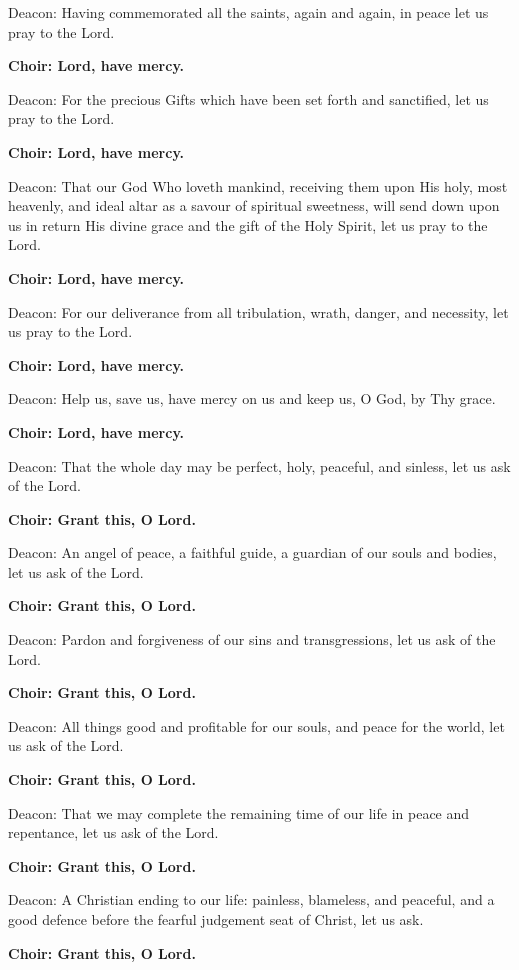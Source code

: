 \documentclass[12pt,a4paper,titlepage]{report}
\begin{document}
\begin{paracol}[1]{2}
  Deacon: Having commemorated all the saints, again and again, in peace let us pray to the Lord.

  \textbf{Choir: Lord, have mercy.}

  Deacon: For the precious Gifts which have been set forth and sanctified, let us pray to the Lord.

  \textbf{Choir: Lord, have mercy.}

  Deacon: That our God Who loveth mankind, receiving them upon His holy, most heavenly, and ideal altar as a savour of spiritual sweetness, will send down upon us in return His divine grace and the gift of the Holy Spirit, let us pray to the Lord.

  \textbf{Choir: Lord, have mercy.}

  Deacon: For our deliverance from all tribulation, wrath, danger, and necessity, let us pray to the Lord.

  \textbf{Choir: Lord, have mercy.}

  Deacon: Help us, save us, have mercy on us and keep us, O God, by Thy grace.

  \textbf{Choir: Lord, have mercy.}

  Deacon: That the whole day may be perfect, holy, peaceful, and sinless, let us ask of the Lord.

  \textbf{Choir: Grant this, O Lord.}

  Deacon: An angel of peace, a faithful guide, a guardian of our souls and bodies, let us ask of the Lord.

  \textbf{Choir: Grant this, O Lord.}

  Deacon: Pardon and forgiveness of our sins and transgressions, let us ask of the Lord.

  \textbf{Choir: Grant this, O Lord.}

  Deacon: All things good and profitable for our souls, and peace for the world, let us ask of the Lord.

  \textbf{Choir: Grant this, O Lord.}

  Deacon: That we may complete the remaining time of our life in peace and repentance, let us ask of the Lord.

  \textbf{Choir: Grant this, O Lord.}

  Deacon: A Christian ending to our life: painless, blameless, and peaceful, and a good defence before the fearful judgement seat of Christ, let us ask.

  \textbf{Choir: Grant this, O Lord.}


\end{paracol}
\end{document}
